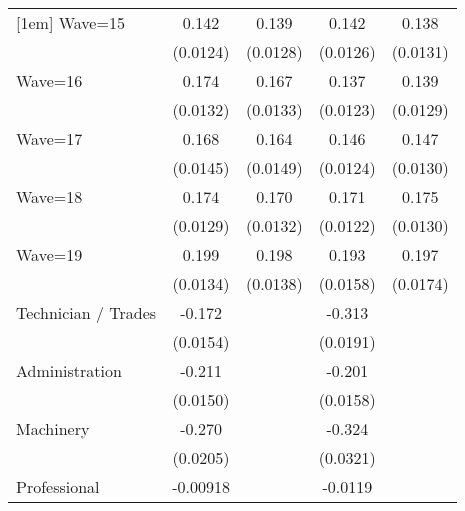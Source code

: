 {\begin{tabular}{l*{4}{c}}
[1em]
Wave=15             &       0.142\sym{***}&       0.139\sym{***}&       0.142\sym{***}&       0.138\sym{***}\\
                    &    (0.0124)         &    (0.0128)         &    (0.0126)         &    (0.0131)         \\
[1em]
Wave=16             &       0.174\sym{***}&       0.167\sym{***}&       0.137\sym{***}&       0.139\sym{***}\\
                    &    (0.0132)         &    (0.0133)         &    (0.0123)         &    (0.0129)         \\
[1em]
Wave=17             &       0.168\sym{***}&       0.164\sym{***}&       0.146\sym{***}&       0.147\sym{***}\\
                    &    (0.0145)         &    (0.0149)         &    (0.0124)         &    (0.0130)         \\
[1em]
Wave=18             &       0.174\sym{***}&       0.170\sym{***}&       0.171\sym{***}&       0.175\sym{***}\\
                    &    (0.0129)         &    (0.0132)         &    (0.0122)         &    (0.0130)         \\
[1em]
Wave=19             &       0.199\sym{***}&       0.198\sym{***}&       0.193\sym{***}&       0.197\sym{***}\\
                    &    (0.0134)         &    (0.0138)         &    (0.0158)         &    (0.0174)         \\
[1em]
Technician / Trades &      -0.172\sym{***}&                     &      -0.313\sym{***}&                     \\
                    &    (0.0154)         &                     &    (0.0191)         &                     \\
[1em]
Administration      &      -0.211\sym{***}&                     &      -0.201\sym{***}&                     \\
                    &    (0.0150)         &                     &    (0.0158)         &                     \\
[1em]
Machinery           &      -0.270\sym{***}&                     &      -0.324\sym{***}&                     \\
                    &    (0.0205)         &                     &    (0.0321)         &                     \\
[1em]
Professional        &    -0.00918         &                     &     -0.0119         &                     \\

\end{tabular}}
